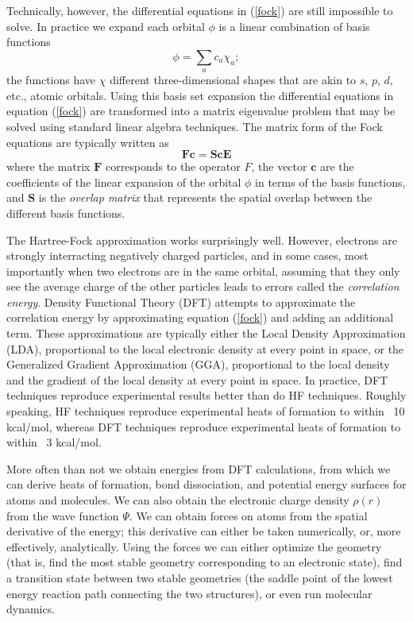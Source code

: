 \documentclass[twocolumn]{revtex4}
\newcommand{\matvec}[1]{\ensuremath{\mathbf{#1}}}
\begin{document}
Technically, however, the differential equations in (\ref{fock}) are
still impossible to solve. In practice we expand each orbital $\phi$
is a linear combination of basis functions
\begin{equation}
\phi = \sum_a c_a\chi_a; 
\end{equation}
the functions have $\chi$ different three-dimensional shapes that are
akin to $s$, $p$, $d$, etc., atomic orbitals. Using this basis set
expansion the differential equations in equation (\ref{fock}) are
transformed into a matrix eigenvalue problem that may be solved using
standard linear algebra techniques. The matrix form of the Fock
equations are typically written as
\begin{equation}
\matvec{F}\matvec{c} = \matvec{S}\matvec{c}\matvec{E}
\end{equation}
where the matrix \matvec{F} corresponds to the operator $F$, the
vector \matvec{c} are the coefficients of the linear expansion of the
orbital $\phi$ in terms of the basis functions, and \matvec{S} is the
\emph{overlap matrix} that represents the spatial overlap between the
different basis functions.

The Hartree-Fock approximation works surprisingly well. However,
electrons are strongly interracting negatively charged particles, and
in some cases, most importantly when two electrons are in the same
orbital, assuming that they only see the average charge of the other
particles leads to errors called the \emph{correlation
energy}. Density Functional Theory (DFT) attempts to approximate the
correlation energy by approximating equation (\ref{fock}) and adding
an additional term. These approximations are typically either the
Local Density Approximation (LDA), proportional to the local
electronic density at every point in space, or the Generalized
Gradient Approximation (GGA), proportional to the local density and
the gradient of the local density at every point in space. In
practice, DFT techniques reproduce experimental results better than do
HF techniques. Roughly speaking, HF techniques reproduce experimental
heats of formation to within ~10 kcal/mol, whereas DFT techniques
reproduce experimental heats of formation to within ~3 kcal/mol.

More often than not we obtain energies from DFT calculations, from
which we can derive heats of formation, bond dissociation, and
potential energy surfaces for atoms and molecules. We can also obtain
the electronic charge density $\rho(r)$ from the wave function $\Psi$.
We can obtain forces on atoms from the spatial derivative of the
energy; this derivative can either be taken numerically, or, more
effectively, analytically. Using the forces we can either optimize the
geometry (that is, find the most stable geometry corresponding to an
electronic state), find a transition state between two stable
geometries (the saddle point of the lowest energy reaction path
connecting the two structures), or even run molecular dynamics.
\end{document}
